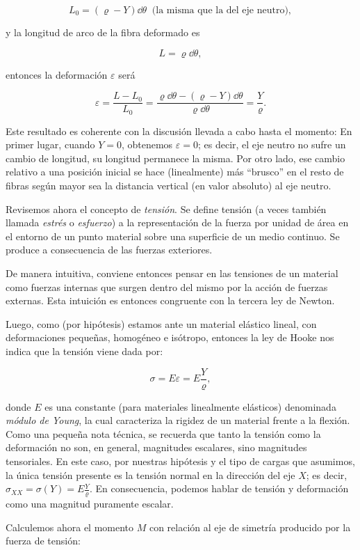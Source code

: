 \[L_0 = (\varrho - Y)\dd\theta \ \text{ (la misma que la del eje neutro)},\]

y la longitud de arco de la fibra deformado es

\[L = \varrho \dd\theta,\]

entonces la deformación $\varepsilon$ será

\[\varepsilon = \frac{L - L_0}{L_0} = \frac{\varrho \dd\theta - (\varrho - Y)\dd\theta}{\varrho \dd\theta} = \frac{Y}{\varrho}.\]

Este resultado es coherente con la discusión llevada a cabo hasta el momento: En primer lugar, cuando $Y = 0$, obtenemos $\varepsilon = 0$; es decir, el eje neutro no sufre un cambio de longitud, su longitud permanece la misma. Por otro lado, ese cambio relativo a una posición inicial se hace (linealmente) más ``brusco'' en el resto de fibras según mayor sea la distancia vertical (en valor absoluto) al eje neutro.

Revisemos ahora el concepto de \textit{tensión}. Se define tensión (a veces también llamada \textit{estrés} o \textit{esfuerzo}) a la representación de la fuerza por unidad de área en el entorno de un punto material sobre una superficie de un medio continuo. Se produce a consecuencia de las fuerzas exteriores.

De manera intuitiva, conviene entonces pensar en las tensiones de un material como fuerzas internas que surgen dentro del mismo por la acción de fuerzas externas. Esta intuición es entonces congruente con la tercera ley de Newton.

Luego, como (por hipótesis) estamos ante un material elástico lineal, con deformaciones pequeñas, homogéneo e isótropo, entonces la ley de Hooke nos indica que la tensión viene dada por:

\[\sigma = E \varepsilon = E \frac{Y}{\varrho},\]

donde $E$ es una constante (para materiales linealmente elásticos) denominada \textit{módulo de Young}, la cual caracteriza la rigidez de un material frente a la flexión. Como una pequeña nota técnica, se recuerda que tanto la tensión como la deformación no son, en general, magnitudes escalares, sino magnitudes tensoriales. En este caso, por nuestras hipótesis y el tipo de cargas que asumimos, la única tensión presente es la tensión normal en la dirección del eje $X$; es decir, $\sigma_{XX} = \sigma(Y) = E \frac{Y}{\varrho}$. En consecuencia, podemos hablar de tensión y deformación como una magnitud puramente escalar.

Calculemos ahora el momento $M$ con relación al eje de simetría producido por la fuerza de tensión:

